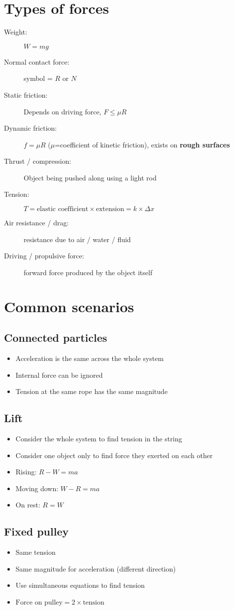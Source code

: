\section{Types of forces}
\begin{description}
    \item[Weight:] $W=mg$
    \item[Normal contact force:] symbol = $R$ or $N$
    \item[Static friction:] Depends on driving force, $F\leq \mu R$
    \item[Dynamic friction:] $f=\mu R$ ($\mu$=coefficient of kinetic friction), exists on \textbf{rough surfaces}
    \item[Thrust / compression:] Object being pushed along using a light rod
    \item[Tension:] $T=\text{elastic coefficient}\times\text{extension}=k\times\Delta x$
    \item[Air resistance / drag:] resistance due to air / water / fluid
    \item[Driving / propulsive force:] forward force produced by the object itself
\end{description}

\section{Common scenarios}
\subsection{Connected particles}
\begin{itemize}
    \item Acceleration is the same across the whole system
    \item Internal force can be ignored
    \item Tension at the same rope has the same magnitude
\end{itemize}

\subsection{Lift}
\begin{itemize}
    \item Consider the whole system to find tension in the string
    \item Consider one object only to find force they exerted on each other
    \item Rising: $R-W=ma$
    \item Moving down: $W-R=ma$
    \item On rest: $R=W$
\end{itemize}

\subsection{Fixed pulley}
\begin{itemize}
    \item Same tension
    \item Same magnitude for acceleration (different direction)
    \item Use simultaneous equations to find tension
    \item $\text{Force on pulley} = 2 \times \text{tension}$
\end{itemize}